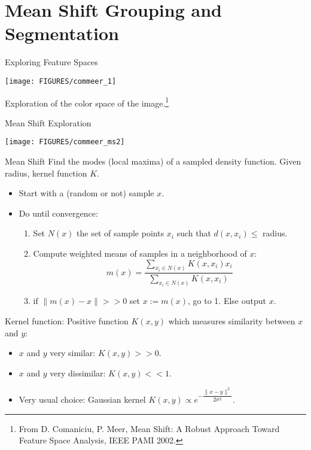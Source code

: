 \documentclass[9pt]{beamer}
\begin{document}
\section{Mean Shift Grouping and Segmentation}
\label{sec:meanshift}

\begin{frame}{Exploring Feature Spaces}
  \begin{center}
  \texttt{[image: FIGURES/commeer\_1]}  
  \end{center}
  Exploration of the color space of the image.\footnote{From
    D. Comaniciu, P. Meer, Mean Shift: A Robust Approach Toward
    Feature Space Analysis, IEEE PAMI 2002.}
\end{frame}

\begin{frame}{Mean Shift Exploration}
  \begin{center}
    \texttt{[image: FIGURES/commeer\_ms2]}
  \end{center}
\end{frame}

\begin{frame}{Mean Shift}
  Find the modes (local maxima) of a sampled density function.
  Given radius, kernel function $K$.
  \begin{itemize}
  \item Start with a (random or not) sample $x$.
  \item Do until convergence:
    \begin{enumerate}
    \item Set $N(x)$ the set of sample points $x_i$ such that $d(x,x_i) \leq$ radius.
    \item Compute weighted means of samples in a neighborhood of $x$:
      $$
      m(x) = \frac{\sum_{x_i\in N(x)} K(x,x_i)x_i}{\sum_{x_i\in N(x)} K(x,x_i)}
      $$
    \item if $\|m(x) - x\| >> 0$ set $x := m(x)$, go to 1. Else output $x$. 
    \end{enumerate}
  \end{itemize}\vfill
  \pause
  Kernel function: Positive function $K(x,y)$ which measures similarity between $x$ and $y$: 
  \begin{itemize}
  \item $x$ and $y$ very similar: $K(x,y) >> 0$.  
  \item$ x$ and $y$ very dissimilar: $K(x,y) << 1$.
  \item Very usual choice: Gaussian kernel $ K(x,y) \propto e^{-\dfrac{\|x-y\|^2}{2\sigma^2}}$.
  \end{itemize}
\end{frame}
\end{document}
